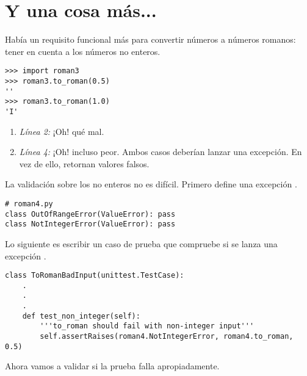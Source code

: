 \section{Y una cosa más...}

Había un requisito funcional más para convertir números a números romanos: tener en cuenta a los números no enteros.

\noindent\begin{minipage}{\textwidth}
\begin{lstlisting}[mathescape=True]
>>> import roman3
>>> roman3.to_roman(0.5)
''
>>> roman3.to_roman(1.0)
'I'
\end{lstlisting}
\end{minipage}

\begin{enumerate}

\item \emph{Línea 2:} ¡Oh! qué mal.

\item \emph{Línea 4:} ¡Oh! incluso peor. Ambos casos deberían lanzar una excepción. En vez de ello, retornan valores falsos.

\end{enumerate}

La validación sobre los no enteros no es difícil. Primero  define una excepción .

\noindent\begin{minipage}{\textwidth}
\begin{lstlisting}[mathescape=True]
# roman4.py
class OutOfRangeError(ValueError): pass
class NotIntegerError(ValueError): pass
\end{lstlisting}
\end{minipage}

Lo siguiente es escribir un caso de prueba que compruebe si se lanza una excepción .

\noindent\begin{minipage}{\textwidth}
\begin{lstlisting}[mathescape=True]
class ToRomanBadInput(unittest.TestCase):
    .
    .
    .
    def test_non_integer(self):
        '''to_roman should fail with non-integer input'''
        self.assertRaises(roman4.NotIntegerError, roman4.to_roman, 0.5)
\end{lstlisting}
\end{minipage}

Ahora vamos a validar si la prueba falla apropiadamente.

